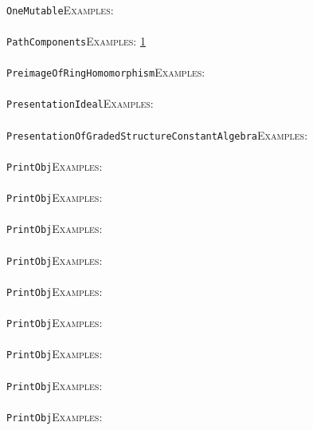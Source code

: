 \documentclass[a4paper,11pt]{report}
\begin{document}
{{ \\
 \texttt{OneMutable}{\nobreakspace}{\nobreakspace}{\nobreakspace}{\nobreakspace}\textsc{Examples:} \\
 \\
 \texttt{PathComponents}{\nobreakspace}{\nobreakspace}{\nobreakspace}{\nobreakspace}\textsc{Examples:} \href{../www/SideLinks/About/aboutQuandles.html} {1}{\nobreakspace} \\
 \\
 \texttt{PreimageOfRingHomomorphism}{\nobreakspace}{\nobreakspace}{\nobreakspace}{\nobreakspace}\textsc{Examples:} \\
 \\
 \texttt{PresentationIdeal}{\nobreakspace}{\nobreakspace}{\nobreakspace}{\nobreakspace}\textsc{Examples:} \\
 \\
 \texttt{PresentationOfGradedStructureConstantAlgebra}{\nobreakspace}{\nobreakspace}{\nobreakspace}{\nobreakspace}\textsc{Examples:} \\
 \\
 \texttt{PrintObj}{\nobreakspace}{\nobreakspace}{\nobreakspace}{\nobreakspace}\textsc{Examples:} \\
 \\
 \texttt{PrintObj}{\nobreakspace}{\nobreakspace}{\nobreakspace}{\nobreakspace}\textsc{Examples:} \\
 \\
 \texttt{PrintObj}{\nobreakspace}{\nobreakspace}{\nobreakspace}{\nobreakspace}\textsc{Examples:} \\
 \\
 \texttt{PrintObj}{\nobreakspace}{\nobreakspace}{\nobreakspace}{\nobreakspace}\textsc{Examples:} \\
 \\
 \texttt{PrintObj}{\nobreakspace}{\nobreakspace}{\nobreakspace}{\nobreakspace}\textsc{Examples:} \\
 \\
 \texttt{PrintObj}{\nobreakspace}{\nobreakspace}{\nobreakspace}{\nobreakspace}\textsc{Examples:} \\
 \\
 \texttt{PrintObj}{\nobreakspace}{\nobreakspace}{\nobreakspace}{\nobreakspace}\textsc{Examples:} \\
 \\
 \texttt{PrintObj}{\nobreakspace}{\nobreakspace}{\nobreakspace}{\nobreakspace}\textsc{Examples:} \\
 \\
 \texttt{PrintObj}{\nobreakspace}{\nobreakspace}{\nobreakspace}{\nobreakspace}\textsc{Examples:} \\
}}
\end{document}
